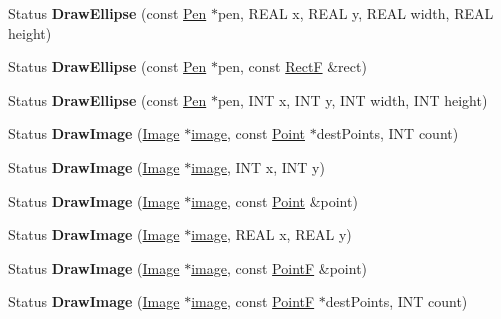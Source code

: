 \begin{DoxyCompactItemize}
Status {\bfseries Draw\+Ellipse} (const \hyperlink{class_pen}{Pen} $\ast$pen, R\+E\+AL x, R\+E\+AL y, R\+E\+AL width, R\+E\+AL height)
\item 
\mbox{\label{class_graphics_adb398ce193e60ae694dac36d7ab0126a}} 
Status {\bfseries Draw\+Ellipse} (const \hyperlink{class_pen}{Pen} $\ast$pen, const \hyperlink{struct_rect_f}{RectF} \&rect)
\item 
\mbox{\label{class_graphics_a2ba1a13437774a821109b761a159f310}} 
Status {\bfseries Draw\+Ellipse} (const \hyperlink{class_pen}{Pen} $\ast$pen, I\+NT x, I\+NT y, I\+NT width, I\+NT height)
\item 
\mbox{\label{class_graphics_ad4b31a7907bba5bce961145a1870b404}} 
Status {\bfseries Draw\+Image} (\hyperlink{class_image}{Image} $\ast$\hyperlink{interfacevoid}{image}, const \hyperlink{struct_point}{Point} $\ast$dest\+Points, I\+NT count)
\item 
\mbox{\label{class_graphics_a1115598e500ef8024df97589cd67edc8}} 
Status {\bfseries Draw\+Image} (\hyperlink{class_image}{Image} $\ast$\hyperlink{interfacevoid}{image}, I\+NT x, I\+NT y)
\item 
\mbox{\label{class_graphics_aee126d29b49557169978eec8eb1f27bc}} 
Status {\bfseries Draw\+Image} (\hyperlink{class_image}{Image} $\ast$\hyperlink{interfacevoid}{image}, const \hyperlink{struct_point}{Point} \&point)
\item 
\mbox{\label{class_graphics_a212a10a1943478b660ede63cc4673157}} 
Status {\bfseries Draw\+Image} (\hyperlink{class_image}{Image} $\ast$\hyperlink{interfacevoid}{image}, R\+E\+AL x, R\+E\+AL y)
\item 
\mbox{\label{class_graphics_aba41709d40d16e1b988dd5047e648261}} 
Status {\bfseries Draw\+Image} (\hyperlink{class_image}{Image} $\ast$\hyperlink{interfacevoid}{image}, const \hyperlink{struct_point_f}{PointF} \&point)
\item 
\mbox{\label{class_graphics_aa6a43de4b4b34680bd4c67559d789b28}} 
Status {\bfseries Draw\+Image} (\hyperlink{class_image}{Image} $\ast$\hyperlink{interfacevoid}{image}, const \hyperlink{struct_point_f}{PointF} $\ast$dest\+Points, I\+NT count)

\end{DoxyCompactItemize}
